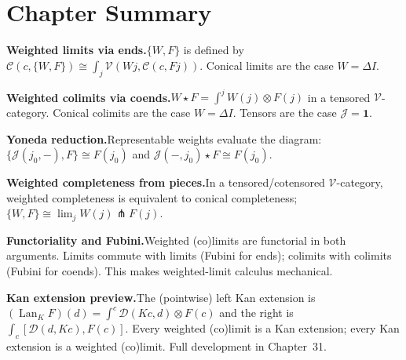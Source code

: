 \begin{exercisesbox}
\begin{qa}
\end{qa}
\end{exercisesbox}


\section*{Chapter Summary}

\begin{summarybox}
\textbf{Weighted limits via ends.}\quad $\{W, F\}$ is defined by
$\mathcal{C}(c, \{W, F\}) \cong \int_j \mathcal{V}(W j, \mathcal{C}(c, F j))$.
Conical limits are the case $W = \Delta I$.

\textbf{Weighted colimits via coends.}\quad $W \star F = \int^j W(j) \otimes
F(j)$ in a tensored $\mathcal{V}$-category. Conical colimits are the case
$W = \Delta I$. Tensors are the case $\mathcal{J} = \mathbf{1}$.

\textbf{Yoneda reduction.}\quad Representable weights evaluate the diagram:
$\{\mathcal{J}(j_0, -), F\} \cong F(j_0)$ and $\mathcal{J}(-, j_0) \star F
\cong F(j_0)$.

\textbf{Weighted completeness from pieces.}\quad In a tensored/cotensored
$\mathcal{V}$-category, weighted completeness is equivalent to conical
completeness; $\{W, F\} \cong \lim_j W(j) \pitchfork F(j)$.

\textbf{Functoriality and Fubini.}\quad Weighted (co)limits are functorial in
both arguments. Limits commute with limits (Fubini for ends); colimits with
colimits (Fubini for coends). This makes weighted-limit calculus mechanical.

\textbf{Kan extension preview.}\quad The (pointwise) left Kan extension is
$(\operatorname{Lan}_K F)(d) = \int^c \mathcal{D}(K c, d) \otimes F(c)$ and
the right is $\int_c [\mathcal{D}(d, K c), F(c)]$. Every weighted (co)limit
is a Kan extension; every Kan extension is a weighted (co)limit. Full
development in Chapter~31.
\end{summarybox}


